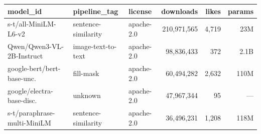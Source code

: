 \documentclass[11pt]{article}
\begin{document}
\begin{table}[H]
\centering\small
\begin{tabular}{lllrrr}
\toprule
\textbf{model\_id} & \textbf{pipeline\_tag} & \textbf{license} & \textbf{downloads} & \textbf{likes} & \textbf{params} \\
\midrule
s-t/all-MiniLM-L6-v2        & sentence-similarity & apache-2.0 & 210,971,565 & 4,719 & 23M \\
Qwen/Qwen3-VL-2B-Instruct   & image-text-to-text  & apache-2.0 & 98,836,433  & 372   & 2.1B \\
google-bert/bert-base-unc.   & fill-mask           & apache-2.0 & 60,494,282  & 2,632 & 110M \\
google/electra-base-disc.    & unknown             & apache-2.0 & 47,967,344  & 95    & --- \\
s-t/paraphrase-multi-MiniLM & sentence-similarity & apache-2.0 & 36,496,231  & 1,208 & 118M \\
\bottomrule
\end{tabular}
\end{table}
\end{document}
